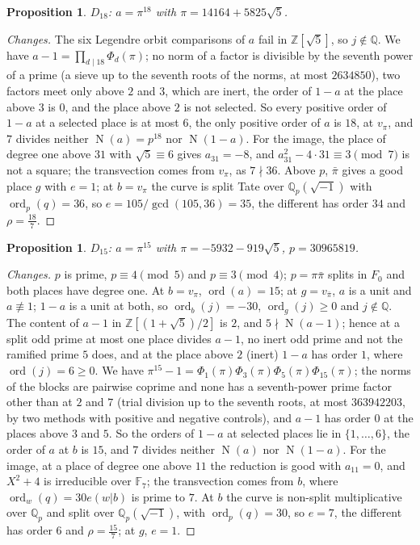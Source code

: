 \documentclass[11pt]{amsart}
\newtheorem{proposition}[theorem]{Proposition}
\theoremstyle{remark}
\newcommand{\Q}{\mathbb Q}
\newcommand{\Z}{\mathbb Z}
\newcommand{\F}{\mathbb F}
\newcommand{\Qp}{\mathbb Q_p}
\newcommand{\Nm}{\operatorname{N}}
\begin{document}
\begin{proposition}\label{p:D18}
$D_{18}$: $a=\pi^{18}$ with $\pi=14164+5825\sqrt5$.
\end{proposition}
\begin{proof}[Changes]
The six Legendre orbit comparisons of $a$ fail in $\Z[\sqrt5]$, so $j\notin\Q$. We have
$a-1=\prod_{d\mid18}\Phi_d(\pi)$; no norm of a factor is divisible by the seventh power of a prime (a sieve up to the
seventh roots of the norms, at most $2634850$), two factors meet only above $2$ and $3$, which are inert, the order of
$1-a$ at the place above $3$ is $0$, and the place above $2$ is not selected. So every positive order of $1-a$ at a
selected place is at most $6$, the only positive order of $a$ is $18$, at $v_\pi$, and $7$ divides neither
$\Nm(a)=p^{18}$ nor $\Nm(1-a)$. For the image, the place of degree one above $31$ with $\sqrt5\equiv6$ gives
$a_{31}=-8$, and $a_{31}^2-4\cdot31\equiv3\pmod7$ is not a square; the transvection comes from $v_\pi$, as $7\nmid36$.
Above $p$, $\bar\pi$ gives a good place $g$ with $e=1$; at $b=v_\pi$ the curve is split Tate over
$\Qp(\sqrt{-1})$ with $\operatorname{ord}_p(q)=36$, so $e=105/\gcd(105,36)=35$, the different has order $34$ and
$\rho=\tfrac{18}7$.
\end{proof}

\begin{proposition}\label{p:D15}
$D_{15}$: $a=\pi^{15}$ with $\pi=-5932-919\sqrt5$, $p=30965819$.
\end{proposition}
\begin{proof}[Changes]
$p$ is prime, $p\equiv4\pmod5$ and $p\equiv3\pmod4$; $p=\pi\bar\pi$ splits in $F_0$ and both places have degree one.
At $b=v_\pi$, $\operatorname{ord}(a)=15$; at $g=v_{\bar\pi}$, $a$ is a unit and $a\not\equiv1$; $1-a$ is a unit at both,
so $\operatorname{ord}_b(j)=-30$, $\operatorname{ord}_g(j)\ge0$ and $j\notin\Q$. The content of $a-1$ in
$\Z[(1+\sqrt5)/2]$ is $2$, and $5\nmid\Nm(a-1)$; hence at a split odd prime at most one place divides $a-1$, no
inert odd prime and not the ramified prime $5$ does, and at the place above $2$ (inert) $1-a$ has order $1$, where
$\operatorname{ord}(j)=6\ge0$. We have $\pi^{15}-1=\Phi_1(\pi)\Phi_3(\pi)\Phi_5(\pi)\Phi_{15}(\pi)$; the norms of the
blocks are pairwise coprime and none has a seventh-power prime factor other than at $2$ and $7$ (trial division up to
the seventh roots, at most $363942203$, by two methods with positive and negative controls), and $a-1$ has order $0$ at
the places above $3$ and $5$. So the orders of $1-a$ at selected places lie in $\{1,\dots,6\}$, the order of $a$ at $b$
is $15$, and $7$ divides neither $\Nm(a)$ nor $\Nm(1-a)$. For the image, at a place of degree one above $11$ the
reduction is good with $a_{11}=0$, and $X^2+4$ is irreducible over $\F_7$; the transvection comes from $b$, where
$\operatorname{ord}_w(q)=30e(w|b)$ is prime to $7$. At $b$ the curve is non-split multiplicative over $\Qp$ and split over
$\Qp(\sqrt{-1})$, with $\operatorname{ord}_p(q)=30$, so $e=7$, the different has order $6$ and $\rho=\tfrac{15}7$; at
$g$, $e=1$.
\end{proof}
\end{document}

